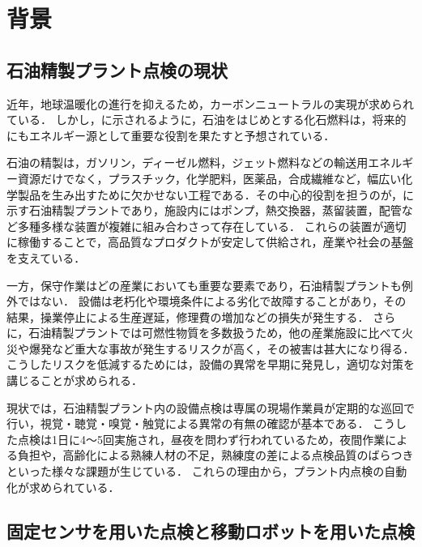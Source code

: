 \documentclass[../main]{subfiles}
\begin{document}

\section{背景}
\label{sec:intro_background}
\subsection{石油精製プラント点検の現状}
\label{sec:intro_plant_current}


近年，地球温暖化の進行を抑えるため，カーボンニュートラルの実現が求められている．
しかし，に示されるように，石油をはじめとする化石燃料は，将来的にもエネルギー源として重要な役割を果たすと予想されている\cite{ritchie2023energy}．

石油の精製は，ガソリン，ディーゼル燃料，ジェット燃料などの輸送用エネルギー資源だけでなく，プラスチック，化学肥料，医薬品，合成繊維など，幅広い化学製品を生み出すために欠かせない工程である．その中心的役割を担うのが，に示す石油精製プラントであり，施設内にはポンプ，熱交換器，蒸留装置，配管など多種多様な装置が複雑に組み合わさって存在している．\cite{eneos2024,Shvindin2008A}
これらの装置が適切に稼働することで，高品質なプロダクトが安定して供給され，産業や社会の基盤を支えている．

一方，保守作業はどの産業においても重要な要素であり，石油精製プラントも例外ではない．
設備は老朽化や環境条件による劣化で故障することがあり，その結果，操業停止による生産遅延，修理費の増加などの損失が発生する．
さらに，石油精製プラントでは可燃性物質を多数扱うため，他の産業施設に比べて火災や爆発など重大な事故が発生するリスクが高く，その被害は甚大になり得る\cite{Tang2021105623}．
こうしたリスクを低減するためには，設備の異常を早期に発見し，適切な対策を講じることが求められる．

現状では，石油精製プラント内の設備点検は専属の現場作業員が定期的な巡回で行い，視覚・聴覚・嗅覚・触覚による異常の有無の確認が基本である．
こうした点検は1日に4～5回実施され，昼夜を問わず行われているため，夜間作業による負担や，高齢化による熟練人材の不足，熟練度の差による点検品質のばらつきといった様々な課題が生じている．
これらの理由から，プラント内点検の自動化が求められている．

\subsection{固定センサを用いた点検と移動ロボットを用いた点検}
\end{document}
